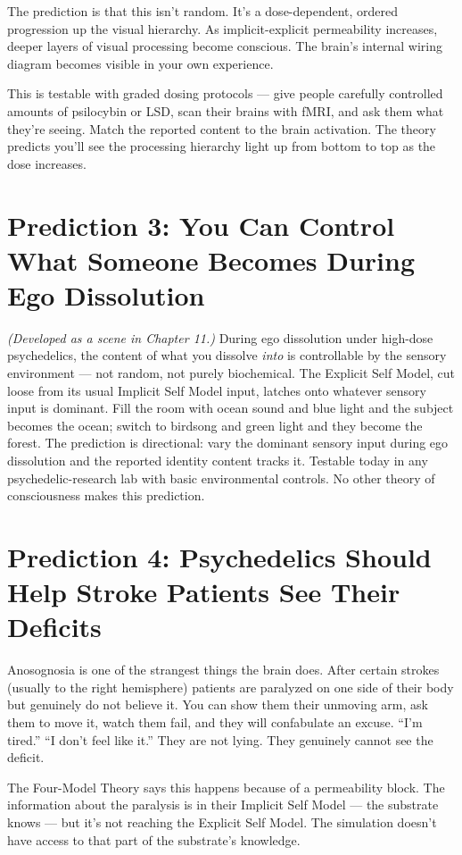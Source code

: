 \documentclass[11pt, twoside, openright]{book}
\begin{document}
The prediction is that this isn't random. It's a dose-dependent, ordered progression up the visual hierarchy. As implicit-explicit permeability increases, deeper layers of visual processing become conscious. The brain's internal wiring diagram becomes visible in your own experience.

This is testable with graded dosing protocols --- give people carefully controlled amounts of psilocybin or LSD, scan their brains with fMRI, and ask them what they're seeing. Match the reported content to the brain activation. The theory predicts you'll see the processing hierarchy light up from bottom to top as the dose increases.

\section*{Prediction 3: You Can Control What Someone Becomes During Ego Dissolution}

\textit{(Developed as a scene in Chapter 11.)} During ego dissolution under high-dose psychedelics, the content of what you dissolve \textit{into} is controllable by the sensory environment --- not random, not purely biochemical. The Explicit Self Model, cut loose from its usual Implicit Self Model input, latches onto whatever sensory input is dominant. Fill the room with ocean sound and blue light and the subject becomes the ocean; switch to birdsong and green light and they become the forest. The prediction is directional: vary the dominant sensory input during ego dissolution and the reported identity content tracks it. Testable today in any psychedelic-research lab with basic environmental controls. No other theory of consciousness makes this prediction.

\section*{Prediction 4: Psychedelics Should Help Stroke Patients See Their Deficits}

Anosognosia is one of the strangest things the brain does. After certain strokes (usually to the right hemisphere) patients are paralyzed on one side of their body but genuinely do not believe it. You can show them their unmoving arm, ask them to move it, watch them fail, and they will confabulate an excuse. ``I'm tired.'' ``I don't feel like it.'' They are not lying. They genuinely cannot see the deficit.

The Four-Model Theory says this happens because of a permeability block. The information about the paralysis is in their Implicit Self Model --- the substrate knows --- but it's not reaching the Explicit Self Model. The simulation doesn't have access to that part of the substrate's knowledge.
\end{document}
